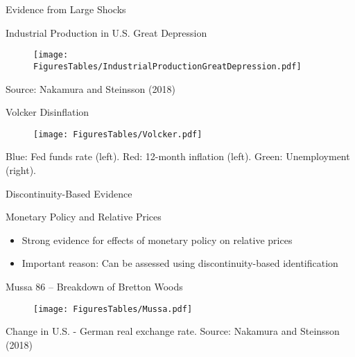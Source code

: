 \documentclass[11pt,aspectratio=169,xcolor={dvipsnames},hyperref={pdftex,pdfpagemode=UseNone,hidelinks,pdfdisplaydoctitle=true},usepdftitle=false]{beamer}
\begin{document}
{  
	\begin{frame}
		\addtocounter{framenumber}{-1}
		\thispagestyle{empty}
		
		\begin{center}
			{\Large Evidence from Large Shocks}
		\end{center}
		
	\end{frame}
}


\begin{frame}{Industrial Production in U.S. Great Depression}
\begin{figure}
\centering
\texttt{[image: FiguresTables/IndustrialProductionGreatDepression.pdf]}
\end{figure}
\vspace{-28pt}
{\scriptsize Source: Nakamura and Steinsson (2018)}
\end{frame}

\begin{frame}{Volcker Disinflation}
\begin{figure}
\centering
\texttt{[image: FiguresTables/Volcker.pdf]}
\end{figure}
\vspace{-25pt}
{\scriptsize Blue: Fed funds rate (left). Red: 12-month inflation (left). Green: Unemployment (right).}
\end{frame}


{  
	\begin{frame}
		\addtocounter{framenumber}{-1}
		\thispagestyle{empty}
		
		\begin{center}
			{\Large Discontinuity-Based Evidence}
		\end{center}
		
	\end{frame}
}

\begin{frame}{Monetary Policy and Relative Prices}
\begin{itemize}
\itemsep1em 
\item Strong evidence for effects of monetary policy on relative prices
\item Important reason: Can be assessed using discontinuity-based identification
\end{itemize}
\end{frame}

\begin{frame}{Mussa 86 -- Breakdown of Bretton Woods}
\begin{figure}
\centering
\texttt{[image: FiguresTables/Mussa.pdf]}
\end{figure}
\vspace{-25pt}
{\scriptsize Change in U.S. - German real exchange rate. Source: Nakamura and Steinsson (2018)}
\end{frame}
\end{document}
